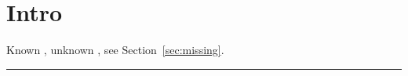 \documentclass{article}
\begin{document}
\section{Intro}\label{sec:intro}
Known \autocite{known2020}, unknown \autocite{nokey2021}, see Section~\ref{sec:missing}.
\label{sec:intro}
\noindent\rule{1.1\textwidth}{2pt}
\printbibliography
\end{document}
